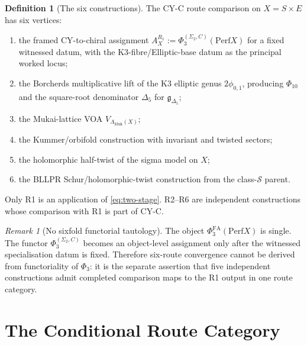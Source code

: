 \documentclass[11pt]{amsart}
\theoremstyle{plain}
\theoremstyle{definition}
\newtheorem{definition}[theorem]{Definition}
\theoremstyle{remark}
\newtheorem{remark}[theorem]{Remark}
\providecommand{\Perf}{\mathrm{Perf}}
\providecommand{\PhiFA}{\Phi^{\mathrm{FA}}}
\providecommand{\Delt}{\Delta_{5}}
\providecommand{\Gdelta}{\mathfrak g_{\Delta_{5}}}
\begin{document}
\begin{definition}[The six constructions]
\label{def:six-constructions}
The CY-C route comparison on $X=S\times E$ has six vertices:
\begin{enumerate}[label=\textbf{R\arabic*.},leftmargin=2.3em]
\item the framed CY-to-chiral assignment
$A_X^{R_1}:=\Phi_3^{(\Sigma_2,C)}(\Perf X)$ for a fixed witnessed
datum, with the K3-fibre/Elliptic-base datum as the principal worked
locus;
\item the Borcherds multiplicative lift of the K3 elliptic genus
$2\phi_{0,1}$, producing $\Phi_{10}$ and the square-root denominator
$\Delt$ for $\Gdelta$;
\item the Mukai-lattice VOA $V_{\Lambda_{\mathrm{Muk}}(X)}$;
\item the Kummer/orbifold construction with invariant and twisted
sectors;
\item the holomorphic half-twist of the sigma model on $X$;
\item the BLLPR Schur/holomorphic-twist construction from the
class-$\mathcal S$ parent.
\end{enumerate}
Only R1 is an application of \eqref{eq:two-stage}.  R2--R6 are
independent constructions whose comparison with R1 is part of CY-C.
\end{definition}

\begin{remark}[No sixfold functorial tautology]
\label{rem:no-sixfold-tautology}
The object $\PhiFA_3(\Perf X)$ is single.  The functor
$\Phi_3^{(\Sigma_2,C)}$ becomes an object-level assignment only after the
witnessed specialisation datum is fixed.  Therefore six-route
convergence cannot be derived from functoriality of $\Phi_3$: it is the
separate assertion that five independent constructions admit completed
comparison maps to the R1 output in one route category.
\end{remark}

\section{The Conditional Route Category}
\label{sec:conditional-route-category}
\end{document}
